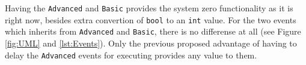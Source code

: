 Having the \texttt{Advanced} and \texttt{Basic} provides the system zero functionality as it is right now, besides extra convertion of \texttt{bool} to an \texttt{int} value.
For the two events which inherits from \texttt{Advanced} and \texttt{Basic}, there is no differense at all (see Figure \ref{fig:UML} and \codeTitle \ref{lst:Events}).
Only the previous proposed advantage of having to delay the \texttt{Advanced} events for executing provides any value to them.